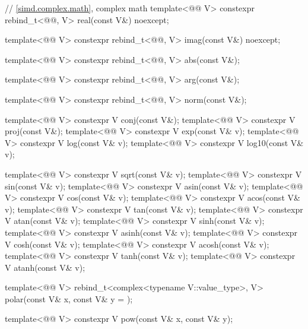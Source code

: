\begin{codeblock}
{  // \ref{simd.complex.math}, complex math
  template<@@ V>
    constexpr rebind_t<@@, V> real(const V&) noexcept;

  template<@@ V>
    constexpr rebind_t<@@, V> imag(const V&) noexcept;

  template<@@ V>
    constexpr rebind_t<@@, V> abs(const V&);

  template<@@ V>
    constexpr rebind_t<@@, V> arg(const V&);

  template<@@ V>
    constexpr rebind_t<@@, V> norm(const V&);

  template<@@ V> constexpr V conj(const V&);
  template<@@ V> constexpr V proj(const V&);
  template<@@ V> constexpr V exp(const V& v);
  template<@@ V> constexpr V log(const V& v);
  template<@@ V> constexpr V log10(const V& v);

  template<@@ V> constexpr V sqrt(const V& v);
  template<@@ V> constexpr V sin(const V& v);
  template<@@ V> constexpr V asin(const V& v);
  template<@@ V> constexpr V cos(const V& v);
  template<@@ V> constexpr V acos(const V& v);
  template<@@ V> constexpr V tan(const V& v);
  template<@@ V> constexpr V atan(const V& v);
  template<@@ V> constexpr V sinh(const V& v);
  template<@@ V> constexpr V asinh(const V& v);
  template<@@ V> constexpr V cosh(const V& v);
  template<@@ V> constexpr V acosh(const V& v);
  template<@@ V> constexpr V tanh(const V& v);
  template<@@ V> constexpr V atanh(const V& v);

  template<@@ V>
    rebind_t<complex<typename V::value_type>, V> polar(const V& x, const V& y = {});

  template<@@ V> constexpr V pow(const V& x, const V& y);

}
\end{codeblock}
